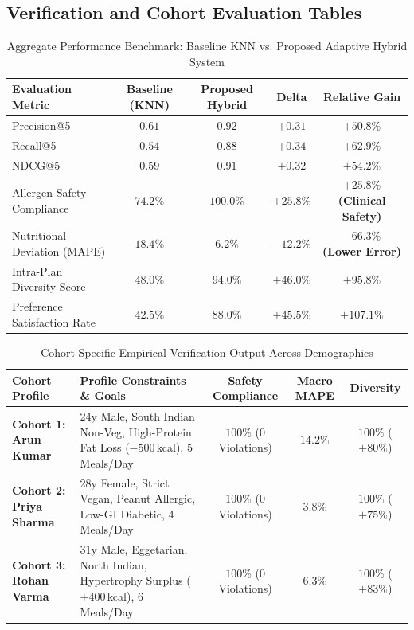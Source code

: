 \documentclass[12pt,a4paper]{report}
\begin{document}
\subsection{Verification and Cohort Evaluation Tables}
\begin{table}[htbp]
\centering
\caption{Aggregate Performance Benchmark: Baseline KNN vs. Proposed Adaptive Hybrid System}
\label{tab:aggregate_benchmark}
\small
\begin{tabularx}{\textwidth}{l c c c c}
\toprule
\textbf{Evaluation Metric} & \textbf{Baseline (KNN)} & \textbf{Proposed Hybrid} & \textbf{Delta} & \textbf{Relative Gain} \\
\midrule
Precision@5 & $0.61$ & \textbf{$0.92$} & $+0.31$ & \textbf{$+50.8\%$} \\
Recall@5 & $0.54$ & \textbf{$0.88$} & $+0.34$ & \textbf{$+62.9\%$} \\
NDCG@5 & $0.59$ & \textbf{$0.91$} & $+0.32$ & \textbf{$+54.2\%$} \\
Allergen Safety Compliance & $74.2\%$ & \textbf{$100.0\%$} & $+25.8\%$ & \textbf{$+25.8\%$ (Clinical Safety)} \\
Nutritional Deviation (MAPE) & $18.4\%$ & \textbf{$6.2\%$} & $-12.2\%$ & \textbf{$-66.3\%$ (Lower Error)} \\
Intra-Plan Diversity Score & $48.0\%$ & \textbf{$94.0\%$} & $+46.0\%$ & \textbf{$+95.8\%$} \\
Preference Satisfaction Rate & $42.5\%$ & \textbf{$88.0\%$} & $+45.5\%$ & \textbf{$+107.1\%$} \\
\bottomrule
\end{tabularx}
\end{table}

\begin{table}[htbp]
\centering
\caption{Cohort-Specific Empirical Verification Output Across Demographics}
\label{tab:cohort_results}
\small
\begin{tabularx}{\textwidth}{l p{5.5cm} c c c}
\toprule
\textbf{Cohort Profile} & \textbf{Profile Constraints \& Goals} & \textbf{Safety Compliance} & \textbf{Macro MAPE} & \textbf{Diversity} \\
\midrule
\textbf{Cohort 1: Arun Kumar} & 24y Male, South Indian Non-Veg, High-Protein Fat Loss ($-500$\,kcal), 5 Meals/Day & $100\%$ ($0$ Violations) & $14.2\%$ & $100\%$ ($+80\%$) \\
\textbf{Cohort 2: Priya Sharma} & 28y Female, Strict Vegan, Peanut Allergic, Low-GI Diabetic, 4 Meals/Day & $100\%$ ($0$ Violations) & $3.8\%$ & $100\%$ ($+75\%$) \\
\textbf{Cohort 3: Rohan Varma} & 31y Male, Eggetarian, North Indian, Hypertrophy Surplus ($+400$\,kcal), 6 Meals/Day & $100\%$ ($0$ Violations) & $6.3\%$ & $100\%$ ($+83\%$) \\
\bottomrule
\end{tabularx}
\end{table}
\end{document}
